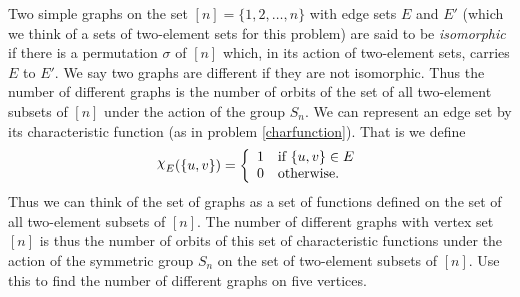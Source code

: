 \itemi Two simple graphs on the set $[n]= \{1,2,\ldots, n\}$ with edge sets $E$ and
$E'$ (which we think of a sets of two-element sets for this problem) are said to be
{\em isomorphic} if there is a permutation $\sigma$ of 
$[n]$ which, in its action of two-element sets, carries $E$ to $E'$.  We say two graphs
are different if they are not isomorphic.  Thus the number of different graphs is the
number of orbits of the set of all two-element subsets of $[n]$ under the action of the
group $S_n$.  We can represent an edge set by its characteristic function (as in
problem \ref{charfunction}).  That is we define $$\Chi_E(\{u,v\}) = \left\{
\begin{array}{ll}
1 & \mbox{if $\{u,v\}\in E$}\\
0 & \mbox{otherwise.}\end{array}\right. $$  Thus we can think of the set of graphs as a
set of functions defined on the set of all two-element subsets of $[n]$.  The number of
different graphs with vertex set $[n]$ is thus the number of orbits of this set of
characteristic functions under the action of the symmetric group $S_n$ on the set of
two-element subsets of $[n]$.  Use this to find the number of different graphs on five
vertices. 
